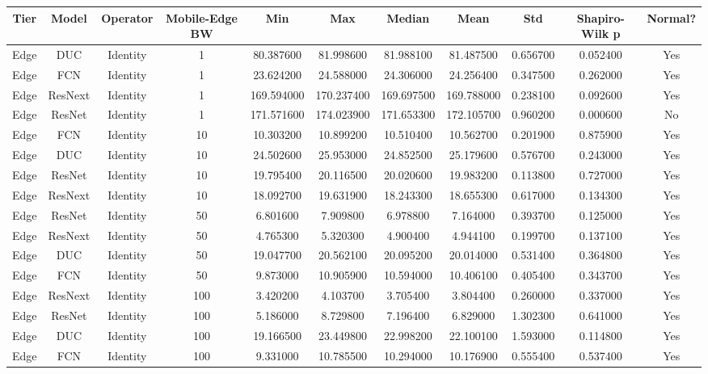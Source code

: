 \begin{tabular}{|c||c||c||c||c||c||c||c||c||c||c|}
\toprule
Tier & Model & Operator & Mobile-Edge BW & Min & Max & Median & Mean & Std & Shapiro-Wilk p & Normal? \\
\midrule
Edge & DUC & Identity & 1 & 80.387600 & 81.998600 & 81.988100 & 81.487500 & 0.656700 & 0.052400 & Yes \\
Edge & FCN & Identity & 1 & 23.624200 & 24.588000 & 24.306000 & 24.256400 & 0.347500 & 0.262000 & Yes \\
Edge & ResNext & Identity & 1 & 169.594000 & 170.237400 & 169.697500 & 169.788000 & 0.238100 & 0.092600 & Yes \\
Edge & ResNet & Identity & 1 & 171.571600 & 174.023900 & 171.653300 & 172.105700 & 0.960200 & 0.000600 & No \\
Edge & FCN & Identity & 10 & 10.303200 & 10.899200 & 10.510400 & 10.562700 & 0.201900 & 0.875900 & Yes \\
Edge & DUC & Identity & 10 & 24.502600 & 25.953000 & 24.852500 & 25.179600 & 0.576700 & 0.243000 & Yes \\
Edge & ResNet & Identity & 10 & 19.795400 & 20.116500 & 20.020600 & 19.983200 & 0.113800 & 0.727000 & Yes \\
Edge & ResNext & Identity & 10 & 18.092700 & 19.631900 & 18.243300 & 18.655300 & 0.617000 & 0.134300 & Yes \\
Edge & ResNet & Identity & 50 & 6.801600 & 7.909800 & 6.978800 & 7.164000 & 0.393700 & 0.125000 & Yes \\
Edge & ResNext & Identity & 50 & 4.765300 & 5.320300 & 4.900400 & 4.944100 & 0.199700 & 0.137100 & Yes \\
Edge & DUC & Identity & 50 & 19.047700 & 20.562100 & 20.095200 & 20.014000 & 0.531400 & 0.364800 & Yes \\
Edge & FCN & Identity & 50 & 9.873000 & 10.905900 & 10.594000 & 10.406100 & 0.405400 & 0.343700 & Yes \\
Edge & ResNext & Identity & 100 & 3.420200 & 4.103700 & 3.705400 & 3.804400 & 0.260000 & 0.337000 & Yes \\
Edge & ResNet & Identity & 100 & 5.186000 & 8.729800 & 7.196400 & 6.829000 & 1.302300 & 0.641000 & Yes \\
Edge & DUC & Identity & 100 & 19.166500 & 23.449800 & 22.998200 & 22.100100 & 1.593000 & 0.114800 & Yes \\
Edge & FCN & Identity & 100 & 9.331000 & 10.785500 & 10.294000 & 10.176900 & 0.555400 & 0.537400 & Yes \\

\end{tabular}
